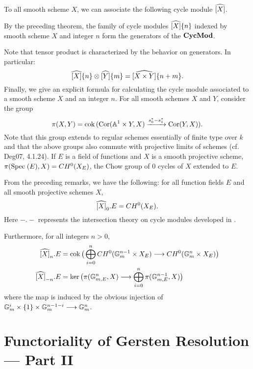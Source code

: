 To all smooth scheme $X$, we can associate the following cycle 
module $\widehat{[X]}$.

By the preceding theorem, the family of cycle modules 
$\widehat{[X]}\{n\}$ indexed by smooth scheme $X$ and integer 
$n$ form the generators of the $\mathbf{CycMod}$.

Note that tensor product is characterized by the behavior on 
generators. In particular:
\[
\widehat{[X]}\{n\} \otimes \widehat{[Y]}\{m\} =
\widehat{[X \times Y]}\{n + m\}.
\]
Finally, we give an explicit formula for calculating the cycle 
module associated to a smooth scheme $X$ and an integer $n$. 
For all smooth schemes $X$ and $Y$, consider the group
\[
\pi(X, Y) = \mathrm{cok}\, (\mathrm{Cor}(\mathbb{A}^1 \times Y, X) 
   \xrightarrow{s_0^* - s_1^*} \mathrm{Cor}(Y, X)).
\]
Note that this group extends to regular schemes essentially of 
finite type over $k$ and that the above groups also commute with
projective limits of schemes (cf. Deg07, 4.1.24). If $E$ is a 
field of functions and $X$ is a smooth projective scheme, 
$\pi(\mathrm{Spec}\;(E), X) = CH^0(X_E)$, the Chow group of 0 cycles of
$X$ extended to $E$.

From the preceding remarks, we have the following: for all 
function fields $E$ and all smooth projective schemes $X$,
\[
\widehat{[X]}_0 . E = CH^0(X_E).
\]
Here $- . -$ represents the intersection theory on cycle modules 
developed in \cite{Ro96}.

Furthermore, for all integers $n > 0$,
\begin{align*}
\widehat{[X]}_n . E &= \mathrm{cok}\,\big( \bigoplus_{i = 0}^n 
   CH^0(\mathbb{G}_m^{n - 1} \times X_E) \longrightarrow 
      CH^0(\mathbb{G}_m^n \times X_E)\big) \\
\widehat{[X]}_{-n} . E &= \mathrm{ker}\,\big(\pi(\mathbb{G}_{m,E}^n, X)
   \longrightarrow \bigoplus_{i = 0}^n \pi(\mathbb{G}_{m, E}^{n - 1}, X)\big)
\end{align*}
where the map is induced by the obvious injection of $\mathbb{G}_m^i 
\times \{1\} \times \mathbb{G}_m^{n - 1 - i} \longrightarrow \mathbb{G}_m^n$.

\section{Functoriality of Gersten Resolution --- Part II}

